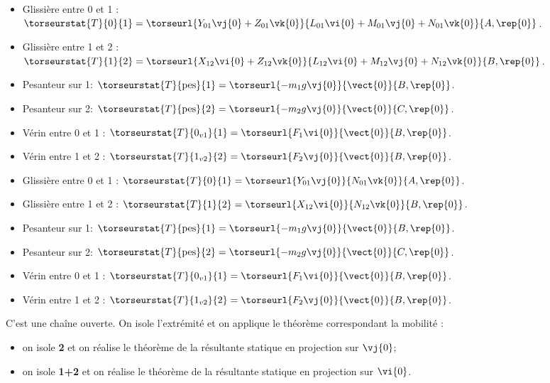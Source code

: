 \ifprof
\begin{itemize}
\item Glissière entre 0 et 1 : $\torseurstat{T}{0}{1}=\torseurl{Y_{01}\vj{0}+Z_{01}\vk{0}}{L_{01}\vi{0}+M_{01}\vj{0}+N_{01}\vk{0}}{A,\rep{0}}$.
\item Glissière entre 1 et 2 : $\torseurstat{T}{1}{2}=\torseurl{X_{12}\vi{0}+Z_{12}\vk{0}}{L_{12}\vi{0}+M_{12}\vj{0}+N_{12}\vk{0}}{B,\rep{0}}$.
\item Pesanteur sur 1: $\torseurstat{T}{\text{pes}}{1}=\torseurl{-m_1g\vj{0}}{\vect{0}}{B,\rep{0}}$.
\item Pesanteur sur 2: $\torseurstat{T}{\text{pes}}{2}=\torseurl{-m_2g\vj{0}}{\vect{0}}{C,\rep{0}}$.
\item Vérin entre 0 et 1 : $\torseurstat{T}{0_{v1}}{1}=\torseurl{F_1\vi{0}}{\vect{0}}{B,\rep{0}}$.
\item Vérin entre 1 et 2 : $\torseurstat{T}{1_{v2}}{2}=\torseurl{F_2\vj{0}}{\vect{0}}{B,\rep{0}}$.
\end{itemize}
\else
\fi


\ifprof
\begin{itemize}
\item Glissière entre 0 et 1 : $\torseurstat{T}{0}{1}=\torseurl{Y_{01}\vj{0}}{N_{01}\vk{0}}{A,\rep{0}}$.
\item Glissière entre 1 et 2 : $\torseurstat{T}{1}{2}=\torseurl{X_{12}\vi{0}}{N_{12}\vk{0}}{B,\rep{0}}$.
\item Pesanteur sur 1: $\torseurstat{T}{\text{pes}}{1}=\torseurl{-m_1g\vj{0}}{\vect{0}}{B,\rep{0}}$.
\item Pesanteur sur 2: $\torseurstat{T}{\text{pes}}{2}=\torseurl{-m_2g\vj{0}}{\vect{0}}{C,\rep{0}}$.
\item Vérin entre 0 et 1 : $\torseurstat{T}{0_{v1}}{1}=\torseurl{F_1\vi{0}}{\vect{0}}{B,\rep{0}}$.
\item Vérin entre 1 et 2 : $\torseurstat{T}{1_{v2}}{2}=\torseurl{F_2\vj{0}}{\vect{0}}{B,\rep{0}}$.
\end{itemize}\else
\fi

\ifprof
C'est une chaîne ouverte. On isole l'extrémité et on applique le théorème correspondant la mobilité : 
\begin{itemize}
\item on isole \textbf{2} et on réalise le théorème de la résultante statique en projection sur $\vj{0}$;
\item on isole \textbf{1+2} et on réalise le théorème de la résultante statique en projection sur $\vi{0}$.
\end{itemize}
\else
\fi


\ifprof
\else


\fi